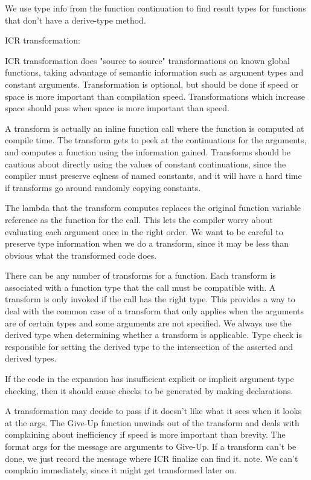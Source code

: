 We use type info from the function continuation to find result types for
functions that don't have a derive-type method.


ICR transformation:

ICR transformation does "source to source" transformations on known global
functions, taking advantage of semantic information such as argument types and
constant arguments.  Transformation is optional, but should be done if speed or
space is more important than compilation speed.  Transformations which increase
space should pass when space is more important than speed.

A transform is actually an inline function call where the function is computed
at compile time.  The transform gets to peek at the continuations for the
arguments, and computes a function using the information gained.  Transforms
should be cautious about directly using the values of constant continuations,
since the compiler must preserve eqlness of named constants, and it will have a
hard time if transforms go around randomly copying constants.

The lambda that the transform computes replaces the original function variable
reference as the function for the call.  This lets the compiler worry about
evaluating each argument once in the right order.  We want to be careful to
preserve type information when we do a transform, since it may be less than
obvious what the transformed code does.

There can be any number of transforms for a function.  Each transform is
associated with a function type that the call must be compatible with.  A
transform is only invoked if the call has the right type.  This provides a way
to deal with the common case of a transform that only applies when the
arguments are of certain types and some arguments are not specified.  We always
use the derived type when determining whether a transform is applicable.  Type
check is responsible for setting the derived type to the intersection of the
asserted and derived types.

If the code in the expansion has insufficient explicit or implicit argument
type checking, then it should cause checks to be generated by making
declarations.

A transformation may decide to pass if it doesn't like what it sees when it
looks at the args.  The Give-Up function unwinds out of the transform and deals
with complaining about inefficiency if speed is more important than brevity.
The format args for the message are arguments to Give-Up.  If a transform can't
be done, we just record the message where ICR finalize can find it.  note.  We
can't complain immediately, since it might get transformed later on.

